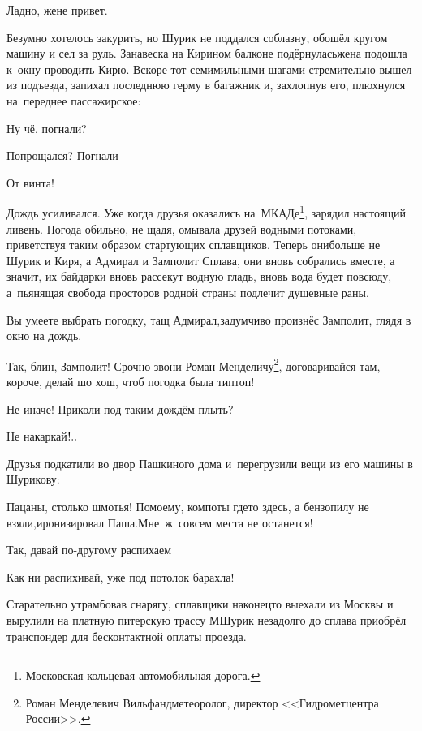 \diagdash Ладно, жене привет.

Безумно хотелось закурить, но Шурик не поддался соблазну, обошёл кругом машину и сел за руль. Занавеска на Кирином балконе подёрнулась\mdash жена подошла к~окну проводить Кирю. Вскоре тот семимильными шагами стремительно вышел из подъезда, запихал последнюю герму в багажник и, захлопнув его, плюхнулся на~переднее пассажирское:

\diagdash Ну чё, погнали?

\diagdash Попрощался? Погнали\myldots{}

\diagdash От винта!

\renewcommand*{\thefootnote}{\arabic{footnote}}

Дождь усиливался. Уже когда друзья оказались на~МКАДе\footnote{Московская кольцевая автомобильная дорога.}, зарядил настоящий ливень. Погода обильно, не щадя, омывала друзей водными потоками, приветствуя таким образом стартующих сплавщиков. Теперь они\mdash больше не Шурик и Киря, а Адмирал и Замполит Сплава, они вновь собрались вместе, а значит, их байдарки вновь рассекут водную гладь, вновь вода будет повсюду, а~пьянящая свобода просторов родной страны подлечит душевные раны.

\diagdash Вы умеете выбрать погодку, тащ Адмирал,\mdash задумчиво произнёс Замполит, глядя в окно на дождь.

\diagdash Так, блин, Замполит! Срочно звони Роман Менделичу\footnote{Роман Менделевич Вильфанд\mdash метеоролог, директор <<Гидрометцентра России>>.}, договаривайся там, короче, делай шо хош, чтоб погодка была тип\sdash топ!

\diagdash Не иначе! Приколи под таким дождём плыть?

\diagdash Не накаркай$\exldots$

\vspace{0.5cm}
\myldots{}Друзья подкатили во двор Пашкиного дома и~перегрузили вещи из его машины в Шурикову:

\diagdash Пацаны, столько шмотья! По\sdash моему, компоты где\sdash то здесь, а бензопилу не взяли,\mdash иронизировал Паша.\mdash Мне~ж~совсем места не останется!

\diagdash Так, давай по-другому распихаем\myldots{}

\diagdash Как ни распихивай, уже под потолок барахла!

Старательно утрамбовав снарягу, сплавщики наконец\sdash то выехали из Москвы и вырулили на платную питерскую трассу М\mdash Шурик незадолго до сплава приобрёл транспондер для бесконтактной оплаты проезда.

